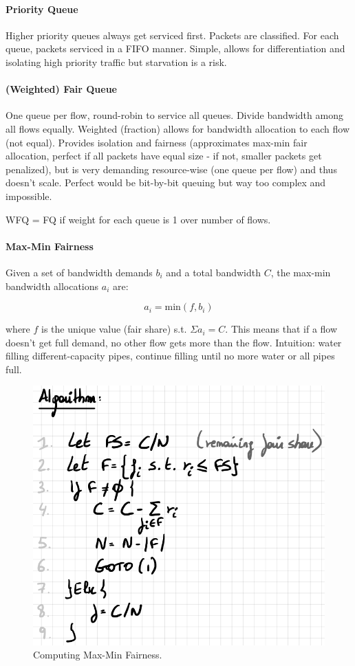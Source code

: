 \paragraph{Priority Queue}
Higher priority queues always get serviced first. Packets are classified. For each queue, packets serviced in a FIFO manner. Simple, allows for differentiation and isolating high priority traffic but starvation is a risk.

\paragraph{(Weighted) Fair Queue}
One queue per flow, round-robin to service all queues. Divide bandwidth among all flows equally. Weighted (fraction) allows for bandwidth allocation to each flow (not equal). Provides isolation and fairness (approximates max-min fair allocation, perfect if all packets have equal size - if not, smaller packets get penalized), but is very demanding resource-wise (one queue per flow) and thus doesn't scale. Perfect would be bit-by-bit queuing but way too complex and impossible. 

WFQ = FQ if weight for each queue is 1 over number of flows.

\paragraph{Max-Min Fairness}
Given a set of bandwidth demands $b_i$ and a total bandwidth $C$, the max-min bandwidth allocations $a_i$ are:

$$a_i = \text{min}(f, b_i)$$

where $f$ is the unique value (fair share) s.t. $\Sigma a_i = C$. This means that if a flow doesn't get full demand, no other flow gets more than the flow. Intuition: water filling different-capacity pipes, continue filling until no more water or all pipes full.

\begin{figure}[h]
	\centering
	\includegraphics[scale=0.5]{images/2-maxmin.PNG}
	\caption{Computing Max-Min Fairness.}
	\label{fig:maxmin}
\end{figure}

